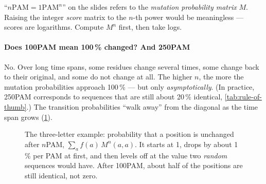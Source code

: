 \documentclass[11pt, oneside]{book}
\begin{document}
\begin{notebox}[title={Power of the probabilities, not of the scores}]
``$n\mathrm{PAM} = 1\mathrm{PAM}^n$'' on the slides refers to the \emph{mutation
probability matrix} $M$. Raising the integer \emph{score} matrix to the $n$-th
power would be meaningless --- scores are logarithms. Compute $M^n$ first,
then take logs.
\end{notebox}

\paragraph{Does 100PAM mean 100\,\% changed? And 250PAM}
No. Over long time spans, some residues change several times, some change back
to their original, and some do not change at all. The higher $n$, the more the
mutation probabilities approach 100\,\% --- but only \emph{asymptotically}.
(In practice, 250PAM corresponds to sequences that are still about 20\,\%
identical, \cref{tab:rule-of-thumb}.) The transition probabilities ``walk
away'' from the diagonal as the time span grows (\cref{fig:pam-decay}).

\begin{figure}[htbp]
\centering
{}
\caption{The three-letter example: probability that a position is unchanged
after $n$PAM, $\sum_a f(a)\,M^n(a,a)$. It starts at 1, drops by about 1\,\% per
PAM at first, and then levels off at the value two \emph{random} sequences
would have. After 100PAM, about half of the positions are still identical,
not zero.}
\label{fig:pam-decay}
\end{figure}
\end{document}
